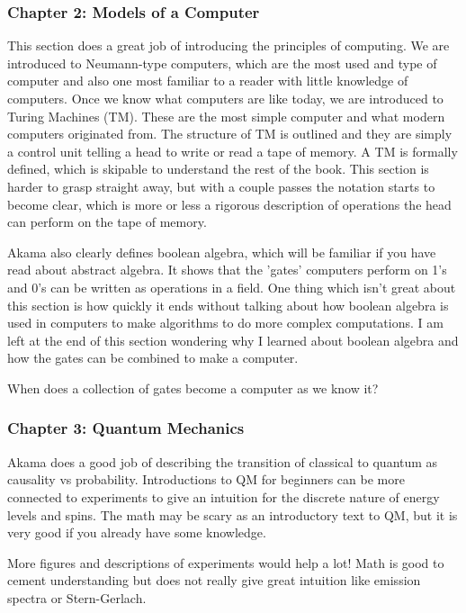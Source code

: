 \documentclass[conf]{new-aiaa}
\begin{document}
\subsubsection{Chapter 2: Models of a Computer}

This section does a great job of introducing the principles of computing. We are introduced to Neumann-type computers, which are the most used and type of computer and also one most familiar to a reader with little knowledge of computers. Once we know what computers are like today, we are introduced to Turing Machines (TM). These are the most simple computer and what modern computers originated from. The structure of TM is outlined and they are simply a control unit telling a head to write or read a tape of memory. A TM is formally defined, which is skipable to understand the rest of the book. This section is harder to grasp straight away, but with a couple passes the notation starts to become clear, which is more or less a rigorous description of operations the head can perform on the tape of memory.

Akama also clearly defines boolean algebra, which will be familiar if you have read about abstract algebra. It shows that the 'gates' computers perform on 1's and 0's can be written as operations in a field. One thing which isn't great about this section is how quickly it ends without talking about how boolean algebra is used in computers to make algorithms to do more complex computations. I am left at the end of this section wondering why I learned about boolean algebra and how the gates can be combined to make a computer.

When does a collection of gates become a computer as we know it?

\subsubsection{Chapter 3: Quantum Mechanics}
Akama does a good job of describing the transition of classical to quantum as causality vs probability. Introductions to QM for beginners can be more connected to experiments to give an intuition for the discrete nature of energy levels and spins. The math may be scary as an introductory text to QM, but it is very good if you already have some knowledge. 

More figures and descriptions of experiments would help a lot! Math is good to cement understanding but does not really give great intuition like emission spectra or Stern-Gerlach.
\end{document}
